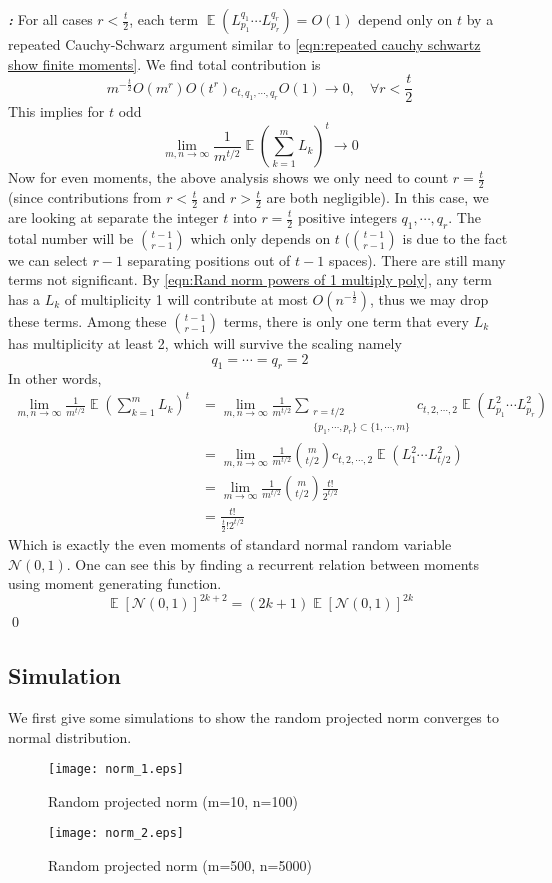 \documentclass[12pt]{extarticle}
\renewenvironment{proof}[1][\proofname]{ { \it\bfseries #1: }}{\qed}
\newcommand{\cN}{{\mathcal{N}}}
\newcommand{\1}{\field{1}}
\DeclareMathOperator{\E}{\mathbb{E}}
\numberwithin{equation}{section}
\begin{document}
\begin{proof}
 For all cases $r<\frac{t}{2}$, each term $\E (L_{p_1}^{q_1} \cdots L_{p_r}^{q_r}) =O(1)$ depend only on $t$ by a repeated Cauchy-Schwarz argument similar to \cref{eqn:repeated cauchy schwartz show finite moments}. We find total contribution is
 \[
  m^{-\frac{t}{2}}O(m^r) O(t^r) c_{t,q_1,\cdots,q_r} O(1) \to 0, \quad \forall r < \frac{t}{2}
 \]
 This implies for $t$ odd
 \[
  \lim_{m,n\to \infty} \frac{1}{m^{t/2}} \E \left(\sum_{k=1}^m L_k \right)^t \to 0
 \]
 Now for even moments, the above analysis shows we only need to count $r=\frac{t}{2}$ (since contributions from $r<\frac{t}{2}$ and $r>\frac{t}{2}$ are both negligible). In this case, we are looking at separate the integer $t$ into $r=\frac{t}{2}$ positive integers $q_1, \cdots, q_r$. The total number will be $\binom{t-1}{r-1}$ which only depends on $t$ ($\binom{t-1}{r-1}$ is due to the fact we can select $r-1$ separating positions out of $t-1$ spaces). There are still many terms not significant. By \cref{eqn:Rand norm powers of 1 multiply poly}, any term has a $L_k$ of multiplicity 1 will contribute at most $O(n^{-\frac{1}{2}})$, thus we may drop these terms. Among these $\binom{t-1}{r-1}$  terms, there is only one term that every $L_k$ has multiplicity at least 2, which will survive the scaling namely
 \[
q_1= \cdots = q_r = 2 
\]
 In other words,
\begin{align*}
    \lim_{m,n\to \infty} \frac{1}{m^{t/2}} \E \left(\sum_{k=1}^m L_k \right)^t
    & = \lim_{m,n\to \infty} \frac{1}{m^{t/2}} \sum_{ \substack{r=t/2 \\ \{p_1,\cdots, p_r\}\subset \{1,\cdots,m\} } } c_{t,2,\cdots,2}\E (L_{p_1}^{2} \cdots L_{p_r}^{2}) \\
    & =\lim_{m,n\to \infty} \frac{1}{m^{t/2}}  \binom{m}{t/2}c_{t,2,\cdots,2} \E (L_{1}^{2} \cdots L_{t/2}^{2}) \\
    & = \lim_{m\to \infty} \frac{1}{m^{t/2}}  \binom{m}{t/2} \frac{t!}{2^{t/2}} \\
    & = \frac{t!}{\frac{t}{2}! 2^{t/2}}
\end{align*}
Which is exactly the even moments of standard normal random variable $\cN(0,1)$. One can see this by finding a recurrent relation between moments using moment generating function. $$\E[\cN(0,1)]^{2k+2} =(2k+1)\E[\cN(0,1)]^{2k}$$
\end{proof}




\subsection{Simulation}
We first give some simulations to show the random  projected norm converges to normal distribution.
\begin{figure}[!ht]
	\texttt{[image: norm\_1.eps]}
	\caption{Random projected norm (m=10, n=100)}
	\label{fig: norm_1 Rand Proj}
\end{figure}
\begin{figure}[!ht]
    \texttt{[image: norm\_2.eps]}
    \caption{Random projected norm (m=500, n=5000)}
    \label{fig: norm_2 Rand Proj}
\end{figure}
\end{document}
